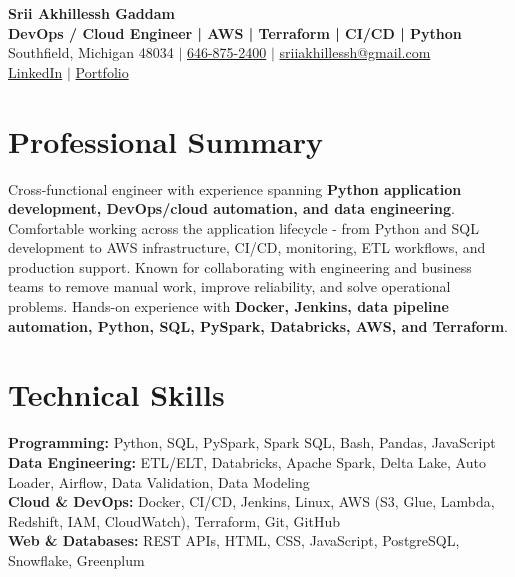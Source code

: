\documentclass[letterpaper,10pt]{article}
\begin{document}
\fontsize{9.35pt}{10.45pt}\selectfont

\begin{center}
    {\LARGE \textbf{Srii Akhillessh Gaddam}} \\[-1pt]
    \textbf{DevOps / Cloud Engineer | AWS | Terraform | CI/CD | Python} \\[2pt]
    Southfield, Michigan 48034 $|$
    \href{tel:6468752400}{646-875-2400} $|$
    \href{mailto:sriiakhillessh@gmail.com}{sriiakhillessh@gmail.com} \\[1pt]
    \href{https://www.linkedin.com/in/srii-akhiilessh-gaddam-b48668191/}{LinkedIn} $|$
    \href{https://sriiakhillesshg.github.io/portfolio/}{Portfolio}
\end{center}
\vspace{-8pt}

\section{Professional Summary}
\small{Cross-functional engineer with experience spanning \textbf{Python application development, DevOps/cloud automation, and data engineering}. Comfortable working across the application lifecycle - from Python and SQL development to AWS infrastructure, CI/CD, monitoring, ETL workflows, and production support. Known for collaborating with engineering and business teams to remove manual work, improve reliability, and solve operational problems. Hands-on experience with \textbf{Docker, Jenkins, data pipeline automation, Python, SQL, PySpark, Databricks, AWS, and Terraform}.}

\section{Technical Skills}
\small{
\textbf{Programming:} Python, SQL, PySpark, Spark SQL, Bash, Pandas, JavaScript \\
\textbf{Data Engineering:} ETL/ELT, Databricks, Apache Spark, Delta Lake, Auto Loader, Airflow, Data Validation, Data Modeling \\
\textbf{Cloud \& DevOps:} Docker, CI/CD, Jenkins, Linux, AWS (S3, Glue, Lambda, Redshift, IAM, CloudWatch), Terraform, Git, GitHub \\
\textbf{Web \& Databases:} REST APIs, HTML, CSS, JavaScript, PostgreSQL, Snowflake, Greenplum
}
\end{document}
